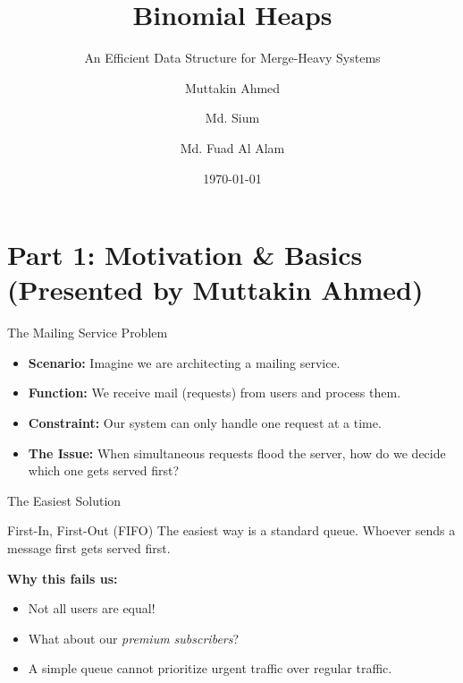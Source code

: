 \documentclass[11pt, aspectratio=169]{beamer}
\title{Binomial Heaps}
\subtitle{An Efficient Data Structure for Merge-Heavy Systems}
\date{\today}
\author{Muttakin Ahmed \and Md. Sium \and Md. Fuad Al Alam}
\institute{CSE200, Bangladesh University of Engineering and Technology}
\begin{document}
\maketitle


\section{Part 1: Motivation \& Basics\\ \small{(Presented by Muttakin Ahmed)}}

\begin{frame}{The Mailing Service Problem}
    \begin{itemize}
        \item \textbf{Scenario:} Imagine we are architecting a mailing service.
        \item \textbf{Function:} We receive mail (requests) from users and process them.
        \item \textbf{Constraint:} Our system can only handle one request at a time.
        \item \textbf{The Issue:} When simultaneous requests flood the server, how do we decide which one gets served first?
    \end{itemize}
\end{frame}

\begin{frame}{The Easiest Solution}
    \begin{alertblock}{First-In, First-Out (FIFO)}
        The easiest way is a standard queue. Whoever sends a message first gets served first.
    \end{alertblock}
    \vspace{0.5cm}
    \textbf{Why this fails us:}
    \begin{itemize}
        \item Not all users are equal!
        \item What about our \textit{premium subscribers}?
        \item A simple queue cannot prioritize urgent traffic over regular traffic.
    \end{itemize}
\end{frame}
\end{document}

